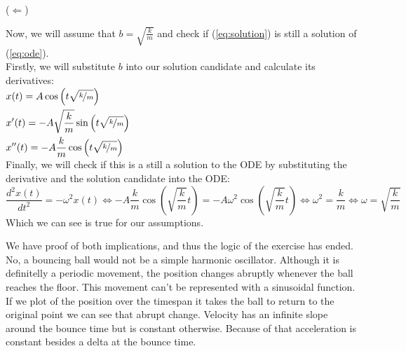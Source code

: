\documentclass{report}
\begin{document}
  \noindent ($\Longleftarrow$)
  \begin{addmargin}{1cm}
    \noindent Now, we will assume that $b=\sqrt{\frac{k}{m}}$ and check if (\ref{eq:solution}) is still a solution of (\ref{eq:ode}).\\
    \noindent Firstly, we will substitute $b$ into our solution candidate and calculate its derivatives:\\

    \vspace{-0.2cm}$\begin{aligned}
      &x(t)=A\cos\left(t\sqrt{\nicefrac{k}{m}}\right)\\
      &x^\prime(t)=-A\sqrt{\frac{k}{m}}\sin\left(t\sqrt{\nicefrac{k}{m}}\right)\\
      &x^{\prime\prime}(t)=-A\frac{k}{m}\cos\left(t\sqrt{\nicefrac{k}{m}}\right)
    \end{aligned}$\\

    \noindent Finally, we will check if this is a still a solution to the ODE by substituting the derivative and the solution candidate into the ODE:
    \[\dfrac{d^2 x(t)}{dt^2}=-\omega^2 x(t)\Longleftrightarrow -A\dfrac{k}{m}\cos\left(\sqrt{\dfrac{k}{m}}t\right)=-A\omega^2\cos\left(\sqrt{\dfrac{k}{m}}t\right)\Longleftrightarrow \omega^2=\dfrac{k}{m}\Longleftrightarrow \omega=\sqrt{\dfrac{k}{m}}\]
    \noindent Which we can see is true for our assumptions.\\
  \end{addmargin}

  \noindent We have proof of both implications, and thus the logic of the exercise has ended.
\clearpage
{}
  \noindent No, a bouncing ball would not be a simple harmonic oscillator. Although it is definitelly a periodic movement, the position changes abruptly whenever the ball reaches the floor. This movement can't be represented with a sinusoidal function.\\
  
  \noindent If we plot of the position over the timespan it takes the ball to return to the original point we can see that abrupt change. Velocity has an infinite slope around the bounce time but is constant otherwise. Because of that acceleration is constant besides a delta at the bounce time.
\end{document}
